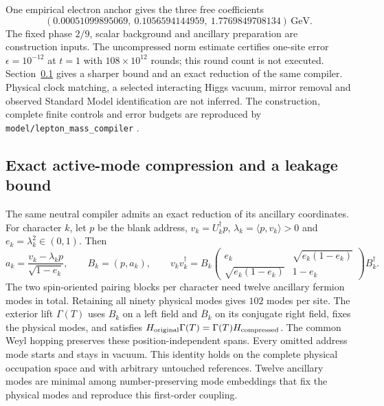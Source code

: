 One empirical electron anchor gives the three free coefficients
\[
 (0.00051099895069,\ 0.1056594144959,\ 1.7769849708134)\,\mathrm{GeV}.
\]
The fixed phase $2/9$, scalar
background and ancillary preparation are construction inputs. The
uncompressed norm estimate certifies one-site error $\epsilon=10^{-12}$
at $t=1$ with $108\times10^{12}$ rounds; this round count is not executed.
Section~\ref{sec:particle-compiler-compression} gives a sharper bound
and an exact reduction of the same compiler.
Physical clock matching, a selected interacting Higgs vacuum, mirror
removal and observed Standard Model identification are not inferred.
The construction, complete finite controls and error budgets are
reproduced by \texttt{model/lepton\_mass\_compiler} \cite{ophrepo}.

\subsection{Exact active-mode compression and a leakage bound}
\label{sec:particle-compiler-compression}

The same neutral compiler admits an exact reduction of its ancillary
coordinates. For character $k$, let $p$ be the blank address,
$v_k=U_k^\dagger p$, $\lambda_k=\langle p,v_k\rangle>0$ and
$e_k=\lambda_k^2\in(0,1)$. Then
\[
 a_k=\frac{v_k-\lambda_kp}{\sqrt{1-e_k}},\qquad
 B_k=(p,a_k),\qquad
 v_kv_k^\dagger=B_k
 \begin{pmatrix}e_k&\sqrt{e_k(1-e_k)}\\
 \sqrt{e_k(1-e_k)}&1-e_k\end{pmatrix}B_k^\dagger.
\]
The two spin-oriented pairing blocks per character need twelve ancillary
fermion modes in total. Retaining all ninety physical modes gives $102$
modes per site. The exterior lift $\Gamma(T)$ uses $B_k$ on a left field
and $\overline B_k$ on its conjugate right field, fixes the physical
modes, and satisfies
$H_{\rm original}\Gamma(T)=\Gamma(T)H_{\rm compressed}$.
The common Weyl hopping preserves these position-independent spans.
Every omitted address mode starts and stays in vacuum. This identity
holds on the complete physical occupation space and with arbitrary
untouched references. Twelve ancillary modes are minimal among
number-preserving mode embeddings that fix the physical modes and
reproduce this first-order coupling.

